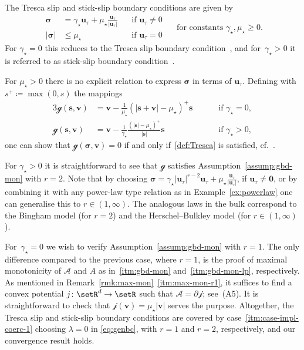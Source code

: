 \documentclass[reqno,a4paper]{amsart}
\def\abs#1{\left| #1 \right|}
\def\vec#1{\boldsymbol{#1}}
\def\b0{\vec{0}}
\def\bs{\vec{s}}
\def\bu{\vec{u}}
\def\bv{\vec{v}}
\def\bsigma{\vec{\sigma}}
\def\gbd{\vec{\mathcal{g}}}
\begin{document}
	\begin{example}\label{ex:Tresca}
		The Tresca slip and stick-slip boundary conditions are given by 	
		\begin{equation}\label{def:Tresca}
			\begin{array}{rlr}
				\bsigma &= \gamma_\star \bu_\tau + \mu_\star \frac{\bu_\tau}{|\bu_\tau|} \;\; & \text{ if }\bu_\tau \neq 0  \\
				|\bsigma| &\leq \mu_\star  & \text{ if }\bu_\tau = 0
			\end{array}
			\quad
			\text{ for constants  }	\gamma_\star,\mu_\star \geq 0.
		\end{equation}
		For $\gamma_{\star} = 0$ this reduces to the Tresca slip boundary condition~\cite{Fuj.1994}, and for~$\gamma_{\star}>0$ it is referred to as stick-slip boundary condition~\cite{LeRoux.2005}.  
		
		For $\mu_\star>0$ there is no explicit relation to express $\bsigma$ in terms of $\bu_\tau$. 
		Defining with $s^+ \coloneqq \max(0,s)$ the mappings 
		\begin{alignat}{3} \label{eq:gbd-Tresca}
			\gbd(\bs,\bv) &= \bv -  \frac{1}{\mu_\star} (\abs{\bs + \bv} - \mu_\star)^+ \bs  \qquad 
			& \text{ if } \gamma_\star = 0,\\
			\label{eq:gbd-stickslip}
			\gbd(\bs,\bv) &= \bv - 
			\frac{1}{\gamma_\star} \frac{(\abs{\bs} - \mu_\star)^+}{\abs{\bs}} \bs   
			& \text{ if } \gamma_\star > 0,
		\end{alignat}
		one can show that $\gbd(\bsigma, \bv) = 0$ if and only if~\eqref{def:Tresca} is satisfied, cf.~\cite{BM.2017}. 
		
		For $\gamma_\star>0$ it is straightforward to see that $\gbd$ satisfies  Assumption~\ref{assump:gbd-mon} with $r = 2$. 
		Note that by choosing $\bsigma = \gamma_{\star} \abs{\bu_\tau}^{r-2}  \bu_\tau  + \mu_{\star} \frac{\bu_\tau}{\abs{\bu_\tau}}$, if $\bu_\tau \neq \b0$, or by combining it with any power-law type relation as in Example~\ref{ex:powerlaw} one can generalise this to $r \in (1,\infty)$. 
		The analogous laws in the bulk correspond to the  Bingham model (for $r = 2$) and the Herschel--Bulkley model (for $r \in (1,\infty)$). 
		
		For~$\gamma_\star = 0$ we wish to verify  Assumption~\ref{assump:gbd-mon} with $r = 1$. 
		The only difference compared to the previous case, where $r = 1$, is the proof of maximal monotonicity of $\mathcal{A}$ and $A$ as in~\ref{itm:gbd-mon} and~\ref{itm:gbd-mon-lp}, respectively.  
		As mentioned in Remark~\ref{rmk:max-mon}~\ref{itm:max-mon-r1}, it suffices to find a convex potential $j \colon \setR^d \to \setR$ such that $\mathcal{A} = \partial \mathcal{j}$; see~(A5). 
		It is straightforward to check that $\mathcal{j}(\bv) = \mu_\star \abs{\bv}$ serves the purpose. 
		Altogether, the Tresca slip and stick-slip boundary conditions are covered by case~\eqref{itm:case-impl-coerc-1} choosing $\lambda = 0$ in \eqref{eq:genbc}, with $r = 1$ and $r = 2$, respectively, and our convergence result holds. 
		

\end{example}
\end{document}
